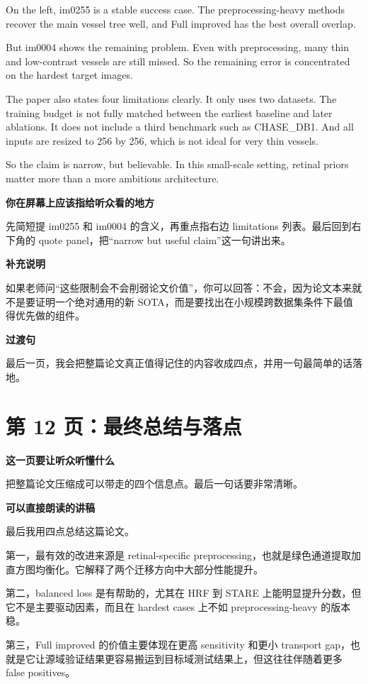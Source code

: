 \documentclass[12pt,a4paper]{ctexart}
\begin{document}
On the left, im0255 is a stable success case. The preprocessing-heavy methods recover the main vessel tree well, and Full improved has the best overall overlap.

But im0004 shows the remaining problem. Even with preprocessing, many thin and low-contrast vessels are still missed. So the remaining error is concentrated on the hardest target images.

The paper also states four limitations clearly. It only uses two datasets. The training budget is not fully matched between the earliest baseline and later ablations. It does not include a third benchmark such as CHASE\_DB1. And all inputs are resized to 256 by 256, which is not ideal for very thin vessels.

So the claim is narrow, but believable. In this small-scale setting, retinal priors matter more than a more ambitious architecture.

\textbf{你在屏幕上应该指给听众看的地方}

先简短提 im0255 和 im0004 的含义，再重点指右边 limitations 列表。最后回到右下角的 quote panel，把“narrow but useful claim”这一句讲出来。

\textbf{补充说明}

如果老师问“这些限制会不会削弱论文价值”，你可以回答：不会，因为论文本来就不是要证明一个绝对通用的新 SOTA，而是要找出在小规模跨数据集条件下最值得优先做的组件。

\textbf{过渡句}

最后一页，我会把整篇论文真正值得记住的内容收成四点，并用一句最简单的话落地。

\section*{第 12 页：最终总结与落点}

\textbf{这一页要让听众听懂什么}

把整篇论文压缩成可以带走的四个信息点。最后一句话要非常清晰。

\textbf{可以直接朗读的讲稿}

最后我用四点总结这篇论文。

第一，最有效的改进来源是 retinal-specific preprocessing，也就是绿色通道提取加直方图均衡化。它解释了两个迁移方向中大部分性能提升。

第二，balanced loss 是有帮助的，尤其在 HRF 到 STARE 上能明显提升分数，但它不是主要驱动因素，而且在 hardest cases 上不如 preprocessing-heavy 的版本稳。

第三，Full improved 的价值主要体现在更高 sensitivity 和更小 transport gap，也就是它让源域验证结果更容易搬运到目标域测试结果上，但这往往伴随着更多 false positives。
\end{document}
